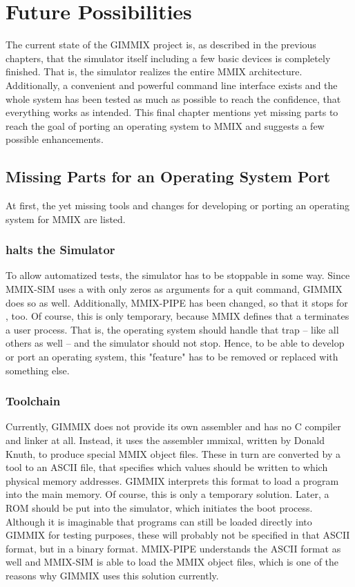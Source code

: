 \chapter{Future Possibilities}

The current state of the GIMMIX project is, as described in the previous chapters, that the simulator itself including a few basic devices is completely finished. That is, the simulator realizes the entire MMIX architecture. Additionally, a convenient and powerful command line interface exists and the whole system has been tested as much as possible to reach the confidence, that everything works as intended. This final chapter mentions yet missing parts to reach the goal of porting an operating system to MMIX and suggests a few possible enhancements.

\section{Missing Parts for an Operating System Port}

At first, the yet missing tools and changes for developing or porting an operating system for MMIX are listed.

\subsection{ halts the Simulator}

To allow automatized tests, the simulator has to be stoppable in some way. Since MMIX-SIM uses a  with only zeros as arguments for a quit command, GIMMIX does so as well. Additionally, MMIX-PIPE has been changed, so that it stops for , too. Of course, this is only temporary, because MMIX defines that a  terminates a user process. That is, the operating system should handle that trap -- like all others as well -- and the simulator should not stop. Hence, to be able to develop or port an operating system, this "feature" has to be removed or replaced with something else.

\subsection{Toolchain}

Currently, GIMMIX does not provide its own assembler and has no C compiler and linker at all. Instead, it uses the assembler \i{mmixal}, written by Donald Knuth, to produce special MMIX object files. These in turn are converted by a tool to an ASCII file, that specifies which values should be written to which physical memory addresses. GIMMIX interprets this format to load a program into the main memory. Of course, this is only a temporary solution. Later, a ROM should be put into the simulator, which initiates the boot process. Although it is imaginable that programs can still be loaded directly into GIMMIX for testing purposes, these will probably not be specified in that ASCII format, but in a binary format. MMIX-PIPE understands the ASCII format as well and MMIX-SIM is able to load the MMIX object files, which is one of the reasons why GIMMIX uses this solution currently.

